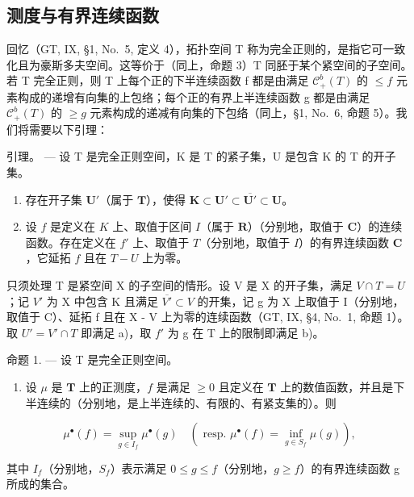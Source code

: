 \subsection{测度与有界连续函数}

回忆（GT, IX, §1, No.~5, 定义 4），拓扑空间 T 称为完全正则的，是指它可一致化且为豪斯多夫空间。这等价于（同上，命题 3）T 同胚于某个紧空间的子空间。若 T 完全正则，则 T 上每个正的下半连续函数 f 都是由满足 \(\mathcal{C}_{+}^{b}(T)\) 的 \(\leqslant f\) 元素构成的递增有向集的上包络；每个正的有界上半连续函数 g 都是由满足 \(\mathcal{C}_{+}^{b}(T)\) 的 \(\geqslant g\) 元素构成的递减有向集的下包络（同上，§1, No.~6, 命题 5）。我们将需要以下引理：

引理。 --- 设 T 是完全正则空间，K 是 T 的紧子集，U 是包含 K 的 T 的开子集。

\begin{enumerate}
\def\labelenumi{\alph{enumi})}
\item
  存在开子集 \(\mathbf{U}'\)（属于 \(\mathbf{T}\)），使得 \(\mathbf{K} \subset \mathbf{U}' \subset \overline{\mathbf{U}'} \subset \mathbf{U}\)。
\item
  设 \(f\) 是定义在 \(K\) 上、取值于区间 \(I\)（属于 \(\mathbf{R}\)）（分别地，取值于 \(\mathbf{C}\)）的连续函数。存在定义在 \(f'\) 上、取值于 \(T\)（分别地，取值于 \(I\)）的有界连续函数 \(\mathbf{C}\)，它延拓 \(f\) 且在 \(T - U\) 上为零。
\end{enumerate}

只须处理 T 是紧空间 X 的子空间的情形。设 V 是 X 的开子集，满足 \(V \cap T = U\)；记 \(V'\) 为 X 中包含 K 且满足 \(\overline{V'} \subset V\) 的开集，记 g 为 X 上取值于 I（分别地，取值于 C）、延拓 f 且在 X - V 上为零的连续函数（GT, IX, §4, No.~1, 命题 1）。取 \(U' = V' \cap T\) 即满足 a)，取 \(f'\) 为 g 在 T 上的限制即满足 b)。

命题 1. --- 设 T 是完全正则空间。

\begin{enumerate}
\def\labelenumi{\alph{enumi})}
\tightlist
\item
  设 \(\mu\) 是 \(\mathbf{T}\) 上的正测度，\(f\) 是满足 \(\geqslant 0\) 且定义在 \(\mathbf{T}\) 上的数值函数，并且是下半连续的（分别地，是上半连续的、有限的、有紧支集的）。则
\end{enumerate}

\[
\mu^ {\bullet} (f) = \sup _ {g \in I _ {f}} \mu^ {\bullet} (g) \quad (\text { resp. } \mu^ {\bullet} (f) = \inf _ {g \in S _ {f}} \mu (g)),\tag{1}
\]

其中 \(I_{f}\)（分别地，\(S_{f}\)）表示满足 \(0 \leqslant g \leqslant f\)（分别地，\(g \geqslant f\)）的有界连续函数 g 所成的集合。

